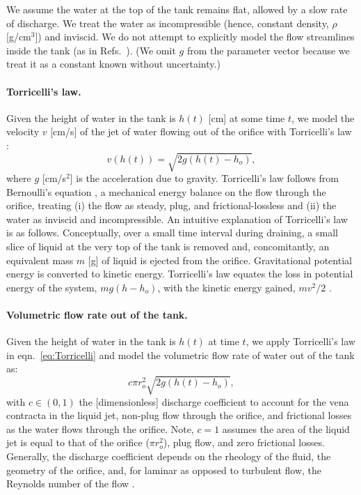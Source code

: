 \documentclass[openacc]{rsproca_new}%
\begin{document}
We assume the water at the top of the tank remains flat, allowed by a slow rate of discharge. We treat the water as incompressible (hence, constant density, $\rho$ [g/cm$^3$]) and inviscid. We do not attempt to explicitly model the flow streamlines inside the tank (as in Refs.~\cite{mathew2014numerical,sakri2017numerical}). (We omit $g$ from the parameter vector because we treat it as a constant known without uncertainty.)

\paragraph{Torricelli's law.}
Given the height of water in the tank is $h(t)$ [cm] at some time $t$, we model the velocity $v$ [cm/s] of the jet of water flowing out of the orifice with Torricelli's law \cite{d2021torricelli}:
\begin{equation}
	v\left(h(t) \right)=  \sqrt{2 g(h(t)-h_o)}, \label{eq:Torricelli}
\end{equation} where $g$ [cm/s$^2$] is the acceleration due to gravity. Torricelli's law follows from Bernoulli's equation \cite{welty2020fundamentals}, a mechanical energy balance on the flow through the orifice, treating (i) the flow as steady, plug, and frictional-lossless and (ii) the water as inviscid and incompressible.
An intuitive explanation of Torricelli's law is as follows. 
Conceptually, over a small time interval during draining, a small slice of liquid at the very top of the tank is removed and, concomitantly, an equivalent mass $m$ [g] of liquid is ejected from the orifice.
Gravitational potential energy is converted to kinetic energy. 
Torricelli's law equates the loss in potential energy of the system, $m g(h-h_o)$, with the kinetic energy gained, $m v^2/2$ \cite{groetsch1993inverse,driver1998torricelli,williams2021vessel}. 

\paragraph{Volumetric flow rate out of the tank.} Given the height of water in the tank is $h(t)$ at time $t$, we apply Torricelli's law in eqn.~\ref{eq:Torricelli} and model the volumetric flow rate of water out of the tank as:
\begin{equation}
	c \pi r_o^2 \sqrt{2 g(h(t)-h_o)}, \label{eq:outletflow}
\end{equation}
with $c\in(0,1)$ the [dimensionless] discharge coefficient to account for the vena contracta in the liquid jet, non-plug flow through the orifice, and frictional losses as the water flows through the orifice. 
Note, $c=1$ assumes the area of the liquid jet is equal to that of the orifice ($\pi r_o^2$), plug flow, and zero frictional losses.
Generally, the discharge coefficient depends on the rheology of the fluid, the geometry of the orifice, and, for laminar as opposed to turbulent flow, the Reynolds number of the flow \cite{teoman2022discharge}. 
\cite{horsch2020simple,teoman2022discharge,hicks2014determining,blasone2015discharge,lienhard1984velocity,wadhwa2021study}
\end{document}
